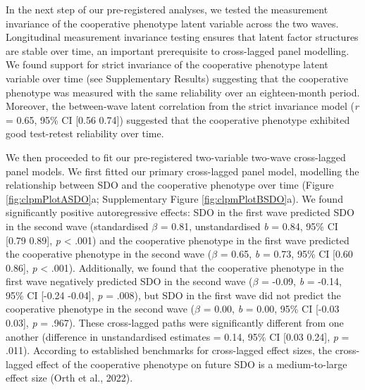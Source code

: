 \documentclass[
  man,floatsintext]{apa6}
\begin{document}
In the next step of our pre-registered analyses, we tested the measurement
invariance of the cooperative phenotype latent variable across the two waves.
Longitudinal measurement invariance testing ensures that latent factor
structures are stable over time, an important prerequisite to cross-lagged
panel modelling. We found support for strict invariance of the cooperative
phenotype latent variable over time (see Supplementary Results) suggesting that
the cooperative phenotype was measured with the same reliability over an
eighteen-month period. Moreover, the between-wave latent correlation from the
strict invariance model (\emph{r} =
0.65, 95\% CI
{[}0.56
0.74{]}) suggested that the
cooperative phenotype exhibited good test-retest reliability over time.

We then proceeded to fit our pre-registered two-variable two-wave cross-lagged
panel models. We first fitted our primary cross-lagged panel model, modelling
the relationship between SDO and the cooperative phenotype over time (Figure
\ref{fig:clpmPlotASDO}a; Supplementary Figure \ref{fig:clpmPlotBSDO}a). We
found significantly positive autoregressive effects: SDO in the first wave
predicted SDO in the second wave (standardised
\(\beta\) = 0.81, unstandardised
\emph{b} = 0.84, 95\% CI {[}0.79
0.89{]}, \emph{p} \textless{} .001) and the cooperative phenotype
in the first wave predicted the cooperative phenotype in the second wave
(\(\beta\) = 0.65, \emph{b} =
0.73, 95\% CI {[}0.60 0.86{]},
\emph{p} \textless{} .001). Additionally, we found that the cooperative phenotype
in the first wave negatively predicted SDO in the second wave (\(\beta\) =
-0.09, \emph{b} =
-0.14, 95\% CI {[}-0.24 -0.04{]},
\emph{p} = .008), but SDO in the first wave did not predict the
cooperative phenotype in the second wave (\(\beta\)
= 0.00, \emph{b} =
0.00, 95\% CI {[}-0.03 0.03{]},
\emph{p} = .967). These cross-lagged paths were significantly
different from one another (difference in unstandardised estimates =
0.14, 95\% CI {[}0.03 0.24{]},
\emph{p} = .011). According to established benchmarks for cross-lagged
effect sizes, the cross-lagged effect of the cooperative phenotype on future SDO
is a medium-to-large effect size (Orth et al., 2022).
\end{document}
